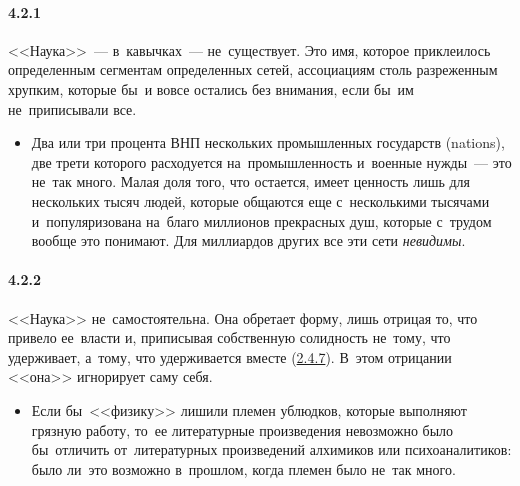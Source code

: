 \paragraph{4.2.1}\hypertarget{par:4.2.1}{} <<Наука>>~--- в~кавычках~--- не~существует. Это имя, которое приклеилось определенным сегментам определенных сетей, ассоциациям столь разреженным хрупким, которые бы~и вовсе остались без внимания, если бы~им не~приписывали все. 
	\begin{itemize}
	\item 
	Два или три процента ВНП нескольких промышленных государств (nations), две трети которого расходуется на~промышленность и~военные нужды~--- это не~так много. Малая доля того, что остается, имеет ценность лишь для нескольких тысяч людей, которые общаются еще с~несколькими тысячами и~популяризована на~благо миллионов прекрасных душ, которые с~трудом вообще это понимают. Для миллиардов других все эти сети {\itshape невидимы}.
	\end{itemize}	

\paragraph{4.2.2}\hypertarget{par:4.2.2}{} <<Наука>> не~самостоятельна. Она обретает форму, лишь отрицая то, что привело ее~власти и, приписывая собственную солидность не~тому, что удерживает, а~тому, что удерживается вместе (\hyperlink{par:2.4.7}{2.4.7}). В~этом отрицании <<она>> игнорирует саму себя.
	\begin{itemize}
	\item 
	Если бы~<<физику>> лишили племен ублюдков, которые выполняют грязную работу, то~ее литературные произведения невозможно было бы~отличить от~литературных произведений алхимиков или психоаналитиков: было ли~это возможно в~прошлом, когда племен было не~так много.
	\end{itemize}	


